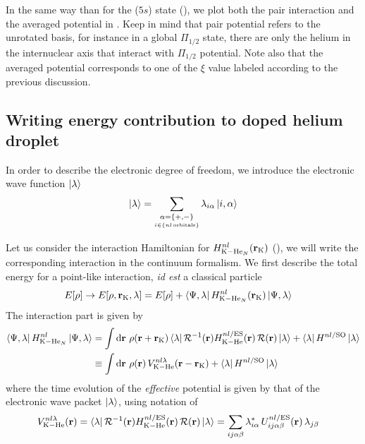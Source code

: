 In the same way than for the ($5s$) state (), we plot both the pair interaction and the averaged potential in . Keep in mind that pair potential refers to the unrotated basis, for instance in a global $\Pi_{1/2}$ state, there are only the helium in the internuclear axis that interact with $\Pi_{1/2}$ potential. Note also that the averaged potential corresponds to one of the $\xi$ value labeled according to the previous discussion.

\subsection{Writing energy contribution to doped helium droplet}

In order to describe the electronic degree of freedom, we introduce the electronic wave function $\ket{\lambda}$
\begin{align}
\ket{\lambda} = \sum_{\underset{i\in \{nl \, \text{orbitals}\}}{\alpha=\{+,-\}}} \lambda_{i\alpha} \ket{i,\alpha}
\label{eq:DIM-lambda-state}
\end{align}

Let us consider the interaction Hamiltonian for $H^{nl}_{\mathrm{K-He}_N}(\vb{r}_{\mathrm{K}})$ (), we will write the corresponding interaction in the continuum formalism. 
We first describe the total energy for a point-like interaction, \textit{id est} a classical particle
\begin{align}
E[\rho] \rightarrow E[\rho, \vb{r}_{\mathrm{K}},\lambda] &= E[\rho]  + \bra{\Psi,\lambda}H^{nl}_{\mathrm{K-He}_N}(\vb{r}_{\mathrm{K}})\ket{\Psi,\lambda} \label{eq:DIM-C-nrj-correction}
\end{align}
The interaction part is given by
\begin{align}
\bra{\Psi,\lambda}H^{nl}_{\mathrm{K-He}_N}\ket{\Psi,\lambda} &= \int \dd{\vb{r}} \, \rho(\vb{r}+\vb{r}_{\mathrm{K}}) \bra{\lambda} \mathcal{R}^{-1}(\vb{r}) H^{nl/\mathrm{ES}}_{\mathrm{K-He}}(\vb{r}) \, \mathcal{R}(\vb{r})\ket{\lambda} + \bra{\lambda}H^{nl/\mathrm{SO}} \ket{\lambda}\\
&\equiv \int \dd{\vb{r}} \, \rho(\vb{r}) \, V_{\mathrm{K-He}}^{nl\lambda}(\vb{r}-\vb{r}_{\mathrm{K}}) +  \bra{\lambda}H^{nl/\mathrm{SO}} \ket{\lambda}
\end{align}
where the time evolution of the \emph{effective} potential is given by that of the electronic wave packet $\ket{\lambda}$, using notation of 
\begin{align}
V_{\mathrm{K-He}}^{nl\lambda}(\vb{r}) &= \bra{\lambda} \mathcal{R}^{-1}(\vb{r}) H^{nl/\mathrm{ES}}_{\mathrm{K-He}}(\vb{r}) \, \mathcal{R}(\vb{r})\ket{\lambda} =  \sum_{ij\alpha\beta} \lambda_{i\alpha}^* \, U^{nl/\mathrm{ES}}_{ij\alpha\beta}(\vb{r}) \, \lambda_{j\beta}
\end{align}

